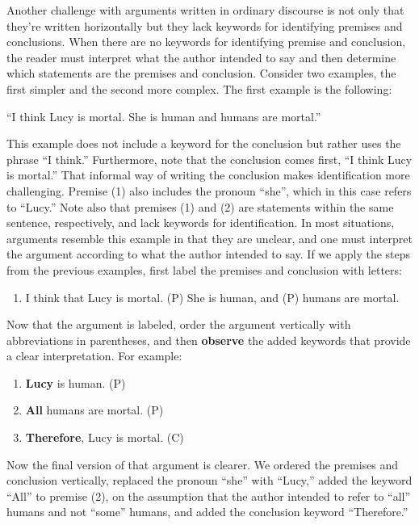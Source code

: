 \documentclass[
]{book}
\providecommand{\tightlist}{%
  \setlength{\itemsep}{0pt}\setlength{\parskip}{0pt}}
\begin{document}
Another challenge with arguments written in ordinary discourse is not only that they're written horizontally but they lack keywords for identifying premises and conclusions. When there are no keywords for identifying premise and conclusion, the reader must interpret what the author intended to say and then determine which statements are the premises and conclusion. Consider two examples, the first simpler and the second more complex. The first example is the following:

``I think Lucy is mortal. She is human and humans are mortal.''

This example does not include a keyword for the conclusion but rather uses the phrase ``I think.'' Furthermore, note that the conclusion comes first, ``I think Lucy is mortal.'' That informal way of writing the conclusion makes identification more challenging. Premise (1) also includes the pronoun ``she'', which in this case refers to ``Lucy.'' Note also that premises (1) and (2) are statements within the same sentence, respectively, and lack keywords for identification. In most situations, arguments resemble this example in that they are unclear, and one must interpret the argument according to what the author intended to say. If we apply the steps from the previous examples, first label the premises and conclusion with letters:

\begin{enumerate}
\def\labelenumi{(\Alph{enumi})}
\setcounter{enumi}{2}
\tightlist
\item
  I think that Lucy is mortal. (P) She is human, and (P) humans are mortal.
\end{enumerate}

Now that the argument is labeled, order the argument vertically with abbreviations in parentheses, and then \textbf{observe} the added keywords that provide a clear interpretation. For example:

\begin{enumerate}
\def\labelenumi{\arabic{enumi}.}
\tightlist
\item
  \textbf{Lucy} is human. (P)\\
\item
  \textbf{All} humans are mortal. (P)\\
\item
  \textbf{Therefore}, Lucy is mortal. (C)
\end{enumerate}

Now the final version of that argument is clearer. We ordered the premises and conclusion vertically, replaced the pronoun ``she'' with ``Lucy,'' added the keyword ``All'' to premise (2), on the assumption that the author intended to refer to ``all'' humans and not ``some'' humans, and added the conclusion keyword ``Therefore.''
\end{document}

